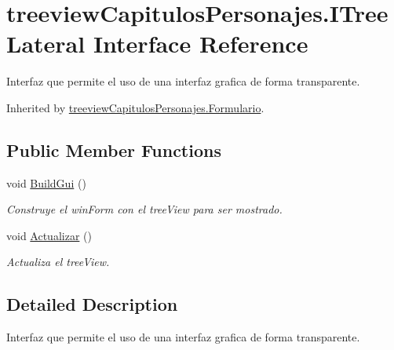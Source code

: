 \hypertarget{interfacetreeview_capitulos_personajes_1_1_i_tree_lateral}{\section{treeview\-Capitulos\-Personajes.\-I\-Tree\-Lateral Interface Reference}
\label{interfacetreeview_capitulos_personajes_1_1_i_tree_lateral}
}


Interfaz que permite el uso de una interfaz grafica de forma transparente.  




Inherited by \hyperlink{classtreeview_capitulos_personajes_1_1_formulario}{treeview\-Capitulos\-Personajes.\-Formulario}.

\subsection*{Public Member Functions}
\begin{DoxyCompactItemize}
\item 
void \hyperlink{interfacetreeview_capitulos_personajes_1_1_i_tree_lateral_a110e0d75c3d909de70febe5bf31dd733}{Build\-Gui} ()
\begin{DoxyCompactList}\small\item\em Construye el win\-Form con el tree\-View para ser mostrado. \end{DoxyCompactList}\item 
void \hyperlink{interfacetreeview_capitulos_personajes_1_1_i_tree_lateral_a61041de84b89c4bcc860840029bcb1d2}{Actualizar} ()
\begin{DoxyCompactList}\small\item\em Actualiza el tree\-View. \end{DoxyCompactList}\end{DoxyCompactItemize}


\subsection{Detailed Description}
Interfaz que permite el uso de una interfaz grafica de forma transparente. 



